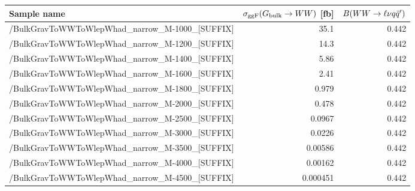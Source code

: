 \footnotesize
\begin{tabular}{lrr}
  \hline
  \textbf{Sample name} & $\sigma_{\mathrm{ggF}}(G_\mathrm{bulk}\to WW)$ [fb] & $B(WW\to\ell\nu q\bar{q}')$ \\
  \hline
  \ttfamily/BulkGravToWWToWlepWhad\_narrow\_M-1000\_[SUFFIX] & 35.1 & 0.442  \\
  \ttfamily/BulkGravToWWToWlepWhad\_narrow\_M-1200\_[SUFFIX] & 14.3 & 0.442  \\
  \ttfamily/BulkGravToWWToWlepWhad\_narrow\_M-1400\_[SUFFIX] & 5.86 & 0.442  \\
  \ttfamily/BulkGravToWWToWlepWhad\_narrow\_M-1600\_[SUFFIX] & 2.41 & 0.442  \\
  \ttfamily/BulkGravToWWToWlepWhad\_narrow\_M-1800\_[SUFFIX] & 0.979 & 0.442  \\
  \ttfamily/BulkGravToWWToWlepWhad\_narrow\_M-2000\_[SUFFIX] & 0.478 & 0.442  \\
  \ttfamily/BulkGravToWWToWlepWhad\_narrow\_M-2500\_[SUFFIX] & 0.0967 & 0.442  \\
  \ttfamily/BulkGravToWWToWlepWhad\_narrow\_M-3000\_[SUFFIX] & 0.0226 & 0.442  \\
  \ttfamily/BulkGravToWWToWlepWhad\_narrow\_M-3500\_[SUFFIX] & 0.00586 & 0.442  \\
  \ttfamily/BulkGravToWWToWlepWhad\_narrow\_M-4000\_[SUFFIX] & 0.00162 & 0.442  \\
  \ttfamily/BulkGravToWWToWlepWhad\_narrow\_M-4500\_[SUFFIX] & 0.000451 & 0.442  \\
  \hline
\end{tabular}
